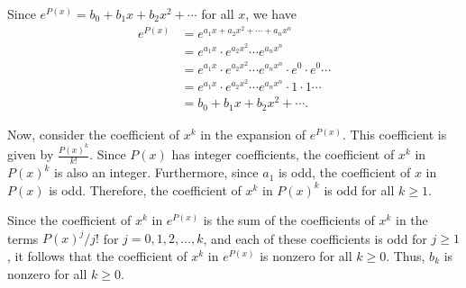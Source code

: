 Since $e^{P(x)} = b_0 + b_1 x + b_2 x^2 + \cdots$ for all $x$, we have
\begin{align*} e^{P(x)} &= e^{a_1 x + a_2 x^2 + \cdots + a_n x^n} \\ &= e^{a_1 x} \cdot e^{a_2 x^2} \cdots e^{a_n x^n} \\ &= e^{a_1 x} \cdot e^{a_2 x^2} \cdots e^{a_n x^n} \cdot e^{0} \cdot e^{0} \cdots \\ &= e^{a_1 x} \cdot e^{a_2 x^2} \cdots e^{a_n x^n} \cdot 1 \cdot 1 \cdots \\ &= b_0 + b_1 x + b_2 x^2 + \cdots. \end{align*}

Now, consider the coefficient of $x^k$ in the expansion of $e^{P(x)}$. This coefficient is given by $\frac{P(x)^k}{k!}$. Since $P(x)$ has integer coefficients, the coefficient of $x^k$ in $P(x)^k$ is also an integer. Furthermore, since $a_1$ is odd, the coefficient of $x$ in $P(x)$ is odd. Therefore, the coefficient of $x^k$ in $P(x)^k$ is odd for all $k \geq 1$.

Since the coefficient of $x^k$ in $e^{P(x)}$ is the sum of the coefficients of $x^k$ in the terms $P(x)^j/j!$ for $j=0,1,2,\ldots,k$, and each of these coefficients is odd for $j \geq 1$, it follows that the coefficient of $x^k$ in $e^{P(x)}$ is nonzero for all $k \geq 0$. Thus, $b_k$ is nonzero for all $k \geq 0$.
